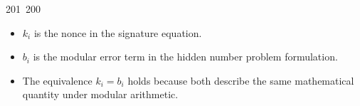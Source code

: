201~200~\documentclass{article}
\begin{document}
	                                                                        	                                                                    	                                	                    	                    	                        	                        	                    	                                                                	                	                                                                    	                    							\begin{itemize}
	                                                                        	                                                                    	                                	                    	                    	                        	                        	                    	                                                                	                	                                                                    	                    							    \item $k_i$ is the nonce in the signature equation.
	                                                                        	                                                                    	                                	                    	                    	                        	                        	                    	                                                                	                	                                                                    	                    							        \item $b_i$ is the modular error term in the hidden number problem formulation.
	                                                                        	                                                                    	                                	                    	                    	                        	                        	                    	                                                                	                	                                                                    	                    							            \item The equivalence $k_i = b_i$ holds because both describe the same mathematical quantity under modular arithmetic.
	                                                                        	                                                                    	                                	                    	                    	                        	                        	                    	                                                                	                	                                                                    	                    							            \end{itemize}
\end{document}
